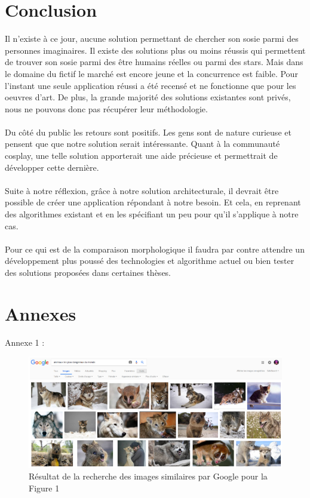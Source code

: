 \documentclass[a4paper,12pt]{article}
\begin{document}
\section*{Conclusion}
Il n'existe à ce jour, aucune solution permettant de chercher son sosie parmi des personnes imaginaires. Il existe des solutions plus ou moins réussis qui permettent de trouver son sosie parmi des être humains réelles ou parmi des stars. Mais dans le domaine du fictif le marché est encore jeune et la concurrence est faible. Pour l'instant une seule application réussi a été recensé et ne fonctionne que pour les oeuvres d'art. De plus, la grande majorité des solutions existantes sont privés, nous ne pouvons donc pas récupérer leur méthodologie. 
\\ \\ 
Du côté du public les retours sont positifs. Les gens sont de nature curieuse et pensent que que notre solution serait intéressante. Quant à la communauté cosplay, une telle solution apporterait une aide précieuse et permettrait de développer cette dernière. 
\\ \\
Suite à notre réflexion, grâce à notre solution architecturale, il devrait être possible de créer une application répondant à notre besoin. Et cela, en reprenant des algorithmes existant et en les spécifiant un peu pour qu'il s'applique à notre cas. 
\\ \\ 
Pour ce qui est de la comparaison morphologique il faudra par contre attendre un développement plus poussé des technologies et algorithme actuel ou bien tester des solutions proposées dans certaines thèses. 
\newpage



\section{Annexes}
Annexe 1 : 
\begin{figure}[!ht]
    \centering
    \includegraphics[scale=0.8]{images/Res2GI.PNG}
    \caption{Résultat de la recherche des images similaires par Google pour la Figure 1}
\end{figure}
\end{document}
